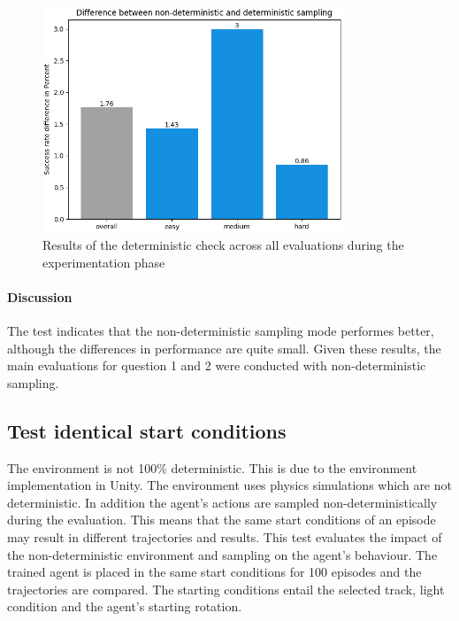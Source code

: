 \begin{figure}
    \centering
    \includegraphics[width=0.8\textwidth]{Bilder/notebook_images/deterministic_check_results.png}
    \caption{Results of the deterministic check across all evaluations during the experimentation phase}
    \label{fig:deterministic_check_result}
\end{figure}

\paragraph{Discussion}
The test indicates that the non-deterministic sampling mode performes better, although the differences in performance are quite small. Given these results, the main evaluations for question 1 and 2 were conducted with non-deterministic sampling.

\subsection{Test identical start conditions}

The environment is not 100\% deterministic. This is due to the environment implementation in Unity. The environment uses physics simulations which are not deterministic. In addition the agent's actions are sampled non-deterministically during the evaluation.
This means that the same start conditions of an episode may result in different trajectories and results. This test evaluates the impact of the non-deterministic environment and sampling on the agent's behaviour. 
The trained agent is placed in the same start conditions for 100 episodes and the trajectories are compared. The starting conditions entail the selected track, light condition and the agent's starting rotation.

